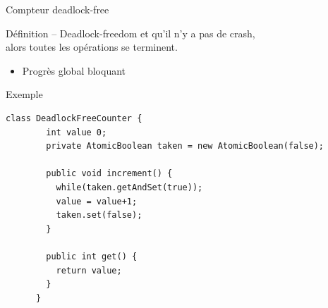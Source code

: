 
\begingroup

\begin{frame}[fragile]{Compteur deadlock-free}

  \begin{block}{Définition -- Deadlock-freedom}
     \alert{et qu'il n'y a pas de crash}, \\
    alors toutes les opérations se terminent.
    \begin{itemize}
    \item Progrès global bloquant
    \end{itemize}
  \end{block}

  \begin{exampleblock}{Exemple}
    \begin{lstlisting}[gobble=6]
      class DeadlockFreeCounter {
        int value 0;
        private AtomicBoolean taken = new AtomicBoolean(false);
        
        public void increment() {
          while(taken.getAndSet(true));
          value = value+1;
          taken.set(false);
        }
        
        public int get() {
          return value;
        }
      }
    \end{lstlisting}
  \end{exampleblock}

\end{frame}

\endgroup
\endinput
